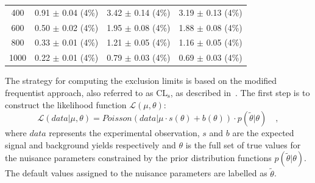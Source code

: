 \begin{table}[htb]
\begin{center}
{\begin{tabular}{c c c c }
 400                        &       0.91 $\pm$       0.04 (4\%)             &       3.42 $\pm$       0.14 (4\%)     &       3.19 $\pm$       0.13 (4\%)      \\
 600                        &       0.50 $\pm$       0.02 (4\%)             &       1.95 $\pm$       0.08 (4\%)     &       1.88 $\pm$       0.08 (4\%)      \\
 800                        &       0.33 $\pm$       0.01 (4\%)             &       1.21 $\pm$       0.05 (4\%)     &       1.16 $\pm$       0.05 (4\%)      \\
 1000                       &       0.22 $\pm$       0.01 (4\%)             &       0.79 $\pm$       0.03 (4\%)     &       0.69 $\pm$       0.03 (4\%)      \\
\bottomrule
\end{tabular}
}
\end{center}
\end{table}

The strategy for computing the exclusion limits is based on the modified frequentist approach, also referred to as $\mathrm{CL_s}$, as described in~\cite{CMS-NOTE-2011-005}. The first step is to construct the likelihood function $\mathcal{L}(\mu,\theta)$:
\begin{equation}
\mathcal{L}(data|\mu,\theta) = Poisson(data|\mu\cdot s(\theta) + b(\theta))\cdot p(\tilde{\theta}|\theta) \quad,
\end{equation}
where $data$ represents the experimental observation, $s$ and $b$ are the expected signal and background yields respectively and $\theta$ is the full set of true values for the nuisance parameters constrained by the prior distribution functions $p(\tilde{\theta}|\theta)$. The default values assigned to the nuisance parameters are labelled as $\tilde{\theta}$.

